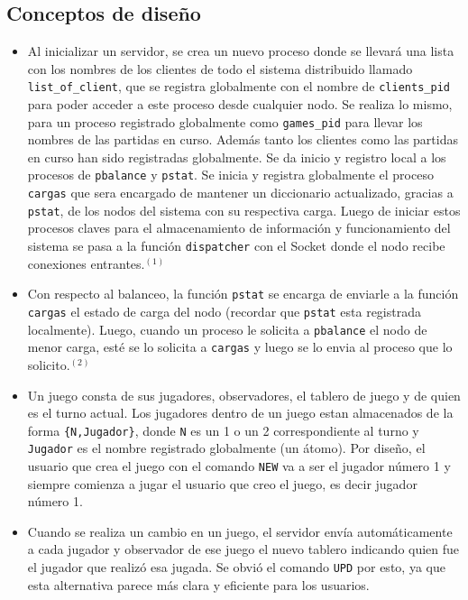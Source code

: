 \documentclass[a4paper]{article}
\newcommand{\blacktr}[0]{\item[$\blacktriangleright$]}
\begin{document}
\subsection*{Conceptos de diseño}
\begin{itemize}
  \blacktr Al inicializar un servidor, se crea un nuevo proceso donde se llevará una lista con los nombres de los clientes de todo el sistema distribuido llamado \texttt{list_of_client}, que se registra globalmente con el nombre de \texttt{clients_pid} para poder acceder a este proceso desde cualquier nodo. Se realiza lo mismo, para un proceso registrado globalmente como \texttt{games_pid} para llevar los nombres de las partidas en curso. Además tanto los clientes como las partidas en curso han sido registradas globalmente. Se da inicio y registro local a los procesos de \texttt{pbalance} y \texttt{pstat}. Se inicia y registra globalmente el proceso \texttt{cargas} que sera encargado de mantener un diccionario actualizado, gracias a \texttt{pstat}, de los nodos del sistema con su respectiva carga. Luego de iniciar estos procesos claves para el almacenamiento de información y funcionamiento del sistema se pasa a la función \texttt{dispatcher} con el Socket donde el nodo recibe conexiones entrantes.$^{(1)}$

  \blacktr Con respecto al balanceo, la función \texttt{pstat} se encarga de enviarle a la función \texttt{cargas} el estado de carga del nodo (recordar que \texttt{pstat} esta registrada localmente). Luego, cuando un proceso le solicita a \texttt{pbalance} el nodo de menor carga, esté se lo solicita a \texttt{cargas} y luego se lo envia al proceso que lo solicito.$^{(2)}$ 

  \blacktr Un juego consta de sus jugadores, observadores, el tablero de juego y de quien es el turno actual. Los jugadores dentro de un juego estan almacenados de la forma \texttt{\{N,Jugador\}}, donde \texttt{N} es un 1 o un 2 correspondiente al turno y \texttt{Jugador} es el nombre registrado globalmente (un átomo). Por diseño, el usuario que crea el juego con el comando \texttt{NEW} va a ser el jugador número 1 y siempre comienza a jugar el usuario que creo el juego, es decir jugador número 1.

  \blacktr Cuando se realiza un cambio en un juego, el servidor envía automáticamente a cada jugador y observador de ese juego el nuevo tablero indicando quien fue el jugador que realizó esa jugada. Se obvió el comando \texttt{UPD} por esto, ya que esta alternativa parece más clara y eficiente para los usuarios. 
\end{itemize}
\end{document}

